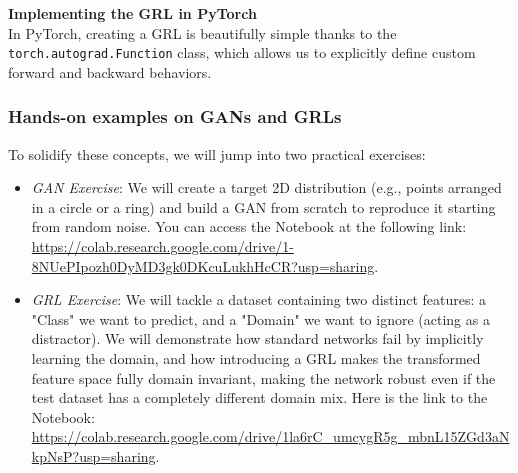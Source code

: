 \textbf{Implementing the GRL in PyTorch} \\
In PyTorch, creating a GRL is beautifully simple thanks to the \texttt{torch.autograd.Function} class, which allows us to explicitly define custom forward and backward behaviors.



\subsubsection{Hands-on examples on GANs and GRLs}
To solidify these concepts, we will jump into two practical exercises:
\begin{itemize}
    \item[-] \textit{GAN Exercise}: We will create a target 2D distribution (e.g., points arranged in a circle or a ring) and build a GAN from scratch to reproduce it starting from random noise. You can access the Notebook at the following link: \url{https://colab.research.google.com/drive/1-8NUePIpozh0DyMD3gk0DKcuLukhHcCR?usp=sharing}.
    \item[-] \textit{GRL Exercise}: We will tackle a dataset containing two distinct features: a "Class" we want to predict, and a "Domain" we want to ignore (acting as a distractor). We will demonstrate how standard networks fail by implicitly learning the domain, and how introducing a GRL makes the transformed feature space fully domain invariant, making the network robust even if the test dataset has a completely different domain mix. Here is the link to the Notebook: \url{https://colab.research.google.com/drive/1la6rC_umcygR5g_mbnL15ZGd3aNkpNsP?usp=sharing}.
\end{itemize}

%


%

